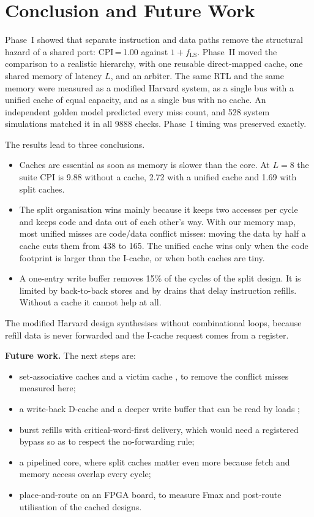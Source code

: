\section{Conclusion and Future Work}
Phase~I showed that separate instruction and data paths remove the structural hazard of a
shared port: CPI\,=\,1.00 against $1+f_{\text{LS}}$. Phase~II moved the comparison to a
realistic hierarchy, with one reusable direct-mapped cache, one shared memory of latency $L$,
and an arbiter. The same RTL and the same memory were measured as a modified Harvard system, as
a single bus with a unified cache of equal capacity, and as a single bus with no cache. An
independent golden model predicted every miss count, and 528 system simulations matched it in
all 9888 checks. Phase~I timing was preserved exactly.

The results lead to three conclusions.
\begin{itemize}
  \item Caches are essential as soon as memory is slower than the core. At $L=8$ the suite CPI
        is 9.88 without a cache, 2.72 with a unified cache and 1.69 with split caches.
  \item The split organisation wins mainly because it keeps two accesses per cycle and keeps
        code and data out of each other's way. With our memory map, most unified misses are
        code/data conflict misses: moving the data by half a cache cuts them from 438 to 165.
        The unified cache wins only when the code footprint is larger than the I-cache, or when
        both caches are tiny.
  \item A one-entry write buffer removes 15\% of the cycles of the split design. It is limited by
        back-to-back stores and by drains that delay instruction refills. Without a cache it
        cannot help at all.
\end{itemize}
The modified Harvard design synthesises without combinational loops, because refill data is
never forwarded and the I-cache request comes from a register.

\textbf{Future work.} The next steps are:
\begin{itemize}
  \item set-associative caches and a victim cache \cite{jouppi1990}, to remove the conflict
        misses measured here;
  \item a write-back D-cache and a deeper write buffer that can be read by loads
        \cite{skadron1997};
  \item burst refills with critical-word-first delivery, which would need a registered bypass
        so as to respect the no-forwarding rule;
  \item a pipelined core, where split caches matter even more because fetch and memory access
        overlap every cycle;
  \item place-and-route on an FPGA board, to measure Fmax and post-route utilisation of the
        cached designs.
\end{itemize}

